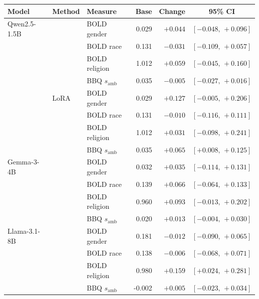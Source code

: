   \footnotesize\setlength{\tabcolsep}{4pt}
  \begin{tabular}{@{}lllrrc@{}}
    \toprule
    Model & Method & Measure & Base & Change & 95\% CI \\
    \midrule
    Qwen2.5-1.5B & \PEAT{} & BOLD gender & 0.029 & $+0.044$ & $[-0.048,\,+0.096]$ \\
     &  & BOLD race & 0.131 & $-0.031$ & $[-0.109,\,+0.057]$ \\
     &  & BOLD religion & 1.012 & $+0.059$ & $[-0.045,\,+0.160]$ \\
     &  & BBQ $s_{\mathrm{amb}}$ & 0.035 & $-0.005$ & $[-0.027,\,+0.016]$ \\
     & LoRA & BOLD gender & 0.029 & $+0.127$ & $[-0.005,\,+0.206]$ \\
     &  & BOLD race & 0.131 & $-0.010$ & $[-0.116,\,+0.111]$ \\
     &  & BOLD religion & 1.012 & $+0.031$ & $[-0.098,\,+0.241]$ \\
     &  & BBQ $s_{\mathrm{amb}}$ & 0.035 & $+0.065$ & $[+0.008,\,+0.125]$ \\
    \midrule
    Gemma-3-4B & \PEAT{} & BOLD gender & 0.032 & $+0.035$ & $[-0.114,\,+0.131]$ \\
     &  & BOLD race & 0.139 & $+0.066$ & $[-0.064,\,+0.133]$ \\
     &  & BOLD religion & 0.960 & $+0.093$ & $[-0.013,\,+0.202]$ \\
     &  & BBQ $s_{\mathrm{amb}}$ & 0.020 & $+0.013$ & $[-0.004,\,+0.030]$ \\
    \midrule
    Llama-3.1-8B & \PEAT{} & BOLD gender & 0.181 & $-0.012$ & $[-0.090,\,+0.065]$ \\
     &  & BOLD race & 0.138 & $-0.006$ & $[-0.068,\,+0.071]$ \\
     &  & BOLD religion & 0.980 & $+0.159$ & $[+0.024,\,+0.281]$ \\
     &  & BBQ $s_{\mathrm{amb}}$ & -0.002 & $+0.005$ & $[-0.023,\,+0.034]$ \\
    \bottomrule
  \end{tabular}
